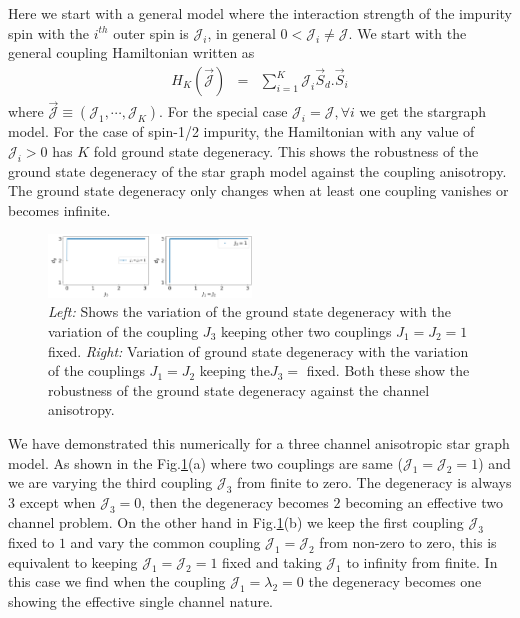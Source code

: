 \documentclass[reprint,prb,superscriptaddress]{revtex4-2}
\begin{document}
Here we start with a general model where the interaction strength of the impurity spin with the $i^{th}$ outer spin is $\mathcal{J}_i$, in general $0<\mathcal{J}_i\neq \mathcal{J}$. We start with the general coupling Hamiltonian written as 
\begin{eqnarray}
H_K (\vec{{\mathcal{J}}}) &=& \sum_{i=1}^{K} {\mathcal{J}}_i\vec{S}_d.\vec{S}_i
\label{eq:anisotropy}
\end{eqnarray}
where $ \vec{{\mathcal{J}}} \equiv ({\mathcal{J}}_1,\cdots,{\mathcal{J}}_K)$. For the special case $\mathcal{J}_i=\mathcal{J}, \forall i$ we get the stargraph model. For the case of spin-1/2 impurity, the Hamiltonian with any value of $\mathcal{J}_i>0$ has $K$ fold ground state degeneracy. This shows the robustness of the ground state degeneracy of the star graph model against the coupling anisotropy. The ground state degeneracy only changes when at least one coupling vanishes or becomes infinite. 
\begin{figure}
\centering
\includegraphics[width=0.48\textwidth]{plt/Anisotropy_Channel_3.png}
\caption{\textit{Left:} Shows the variation of the ground state degeneracy with the variation of the coupling $J_3$ keeping other two couplings $J_1=J_2=1$ fixed. \textit{Right:} Variation of ground state degeneracy with the variation of the couplings $J_1=J_2$ keeping the$J_3=$ fixed. Both these show the robustness of the ground state degeneracy against the channel anisotropy.}
\label{fig:channel-anisotropy-}
\end{figure}

We have demonstrated this numerically for a three channel anisotropic star graph model. As shown in the Fig.\ref{fig:channel-anisotropy-}(a) where two couplings are same (${\mathcal{J}}_1={\mathcal{J}}_2=1$) and we are varying the third coupling ${\mathcal{J}}_3$ from finite to zero. The degeneracy is always $3$ except when ${\mathcal{J}}_3=0$, then the degeneracy becomes $2$ becoming an effective two channel problem. On the other hand in Fig.\ref{fig:channel-anisotropy-}(b) we keep the first coupling ${\mathcal{J}}_3$ fixed to $1$ and vary the common coupling ${\mathcal{J}}_1={\mathcal{J}}_2$ from non-zero to zero, this is equivalent to keeping ${\mathcal{J}}_1={\mathcal{J}}_2=1$ fixed and taking ${\mathcal{J}}_1$ to infinity from finite. In this case we find when the coupling ${\mathcal{J}}_1=\lambda_2=0$ the degeneracy becomes one showing the effective single channel nature.
\end{document}
